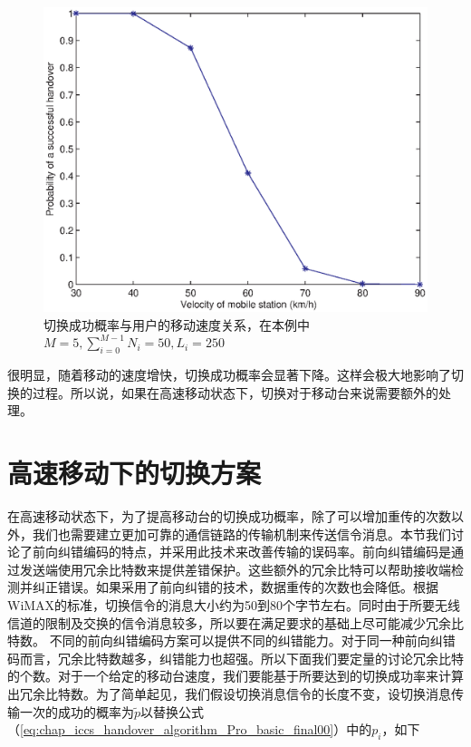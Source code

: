 \begin{figure}[htbp]
\begin{centering}
\includegraphics[scale=0.7]{iccs_speed_prob_theroy}
\caption{切换成功概率与用户的移动速度关系，在本例中$M=5, \sum_{i=0}^{M-1}N_i=50, L_i=250$}
\label{fig:chap_iccs_handover_algorithm_Pro_V}
\end{centering}
\end{figure}

很明显，随着移动的速度增快，切换成功概率会显著下降。这样会极大地影响了切换的过程。所以说，如果在高速移动状态下，切换对于移动台来说需要额外的处理。

\section{高速移动下的切换方案}
在高速移动状态下，为了提高移动台的切换成功概率，除了可以增加重传的次数以外，我们也需要建立更加可靠的通信链路的传输机制来传送信令消息。本节我们讨论了前向纠错编码的特点，并采用此技术来改善传输的误码率。前向纠错编码是通过发送端使用冗余比特数来提供差错保护。这些额外的冗余比特可以帮助接收端检测并纠正错误。如果采用了前向纠错的技术，数据重传的次数也会降低。根据WiMAX的标准，切换信令的消息大小约为50到80个字节左右。同时由于所要无线信道的限制及交换的信令消息较多，所以要在满足要求的基础上尽可能减少冗余比特数。
不同的前向纠错编码方案可以提供不同的纠错能力。对于同一种前向纠错码而言，冗余比特数越多，纠错能力也超强。所以下面我们要定量的讨论冗余比特的个数。对于一个给定的移动台速度，我们要能基于所要达到的切换成功率来计算出冗余比特数。为了简单起见，我们假设切换消息信令的长度不变，设切换消息传输一次的成功的概率为$\tilde{p}$以替换公式（\ref{eq:chap_iccs_handover_algorithm_Pro_basic_final00}）中的$p_i$，如下

